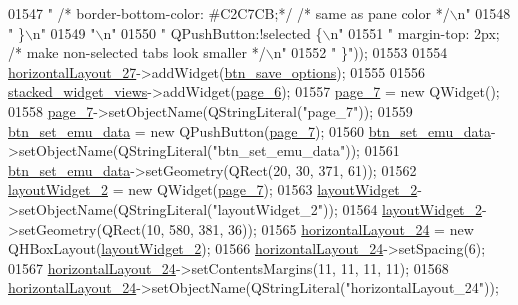 \begin{DoxyCode}
01547 \textcolor{stringliteral}{"   /*  border-bottom-color: #C2C7CB;*/ /* same as pane color */\(\backslash\)n"}
01548 \textcolor{stringliteral}{" \}\(\backslash\)n"}
01549 \textcolor{stringliteral}{"\(\backslash\)n"}
01550 \textcolor{stringliteral}{" QPushButton:!selected \{\(\backslash\)n"}
01551 \textcolor{stringliteral}{"     margin-top: 2px; /* make non-selected tabs look smaller */\(\backslash\)n"}
01552 \textcolor{stringliteral}{" \}"}));
01553 
01554         \hyperlink{a00027_acbfe65f9d2895246b00c82c815b5369e}{horizontalLayout\_27}->addWidget(\hyperlink{a00027_a409e5b794dbab22d7b958be406b6a030}{btn\_save\_options});
01555 
01556         \hyperlink{a00027_a59e39bd3d716004e840a5be5dda18b96}{stacked\_widget\_views}->addWidget(\hyperlink{a00027_a48c3dca01f963265cd2ffca998842e05}{page\_6});
01557         \hyperlink{a00027_a2a58b14a203be787ef1600453f795d71}{page\_7} = \textcolor{keyword}{new} QWidget();
01558         \hyperlink{a00027_a2a58b14a203be787ef1600453f795d71}{page\_7}->setObjectName(QStringLiteral(\textcolor{stringliteral}{"page\_7"}));
01559         \hyperlink{a00027_ad05944ce9c8afb0ab60549a326b8e0af}{btn\_set\_emu\_data} = \textcolor{keyword}{new} QPushButton(\hyperlink{a00027_a2a58b14a203be787ef1600453f795d71}{page\_7});
01560         \hyperlink{a00027_ad05944ce9c8afb0ab60549a326b8e0af}{btn\_set\_emu\_data}->setObjectName(QStringLiteral(\textcolor{stringliteral}{"btn\_set\_emu\_data"}));
01561         \hyperlink{a00027_ad05944ce9c8afb0ab60549a326b8e0af}{btn\_set\_emu\_data}->setGeometry(QRect(20, 30, 371, 61));
01562         \hyperlink{a00027_a873441ec9cec68e0d4eacee271765553}{layoutWidget\_2} = \textcolor{keyword}{new} QWidget(\hyperlink{a00027_a2a58b14a203be787ef1600453f795d71}{page\_7});
01563         \hyperlink{a00027_a873441ec9cec68e0d4eacee271765553}{layoutWidget\_2}->setObjectName(QStringLiteral(\textcolor{stringliteral}{"layoutWidget\_2"}));
01564         \hyperlink{a00027_a873441ec9cec68e0d4eacee271765553}{layoutWidget\_2}->setGeometry(QRect(10, 580, 381, 36));
01565         \hyperlink{a00027_a9403b9a7c13814220caeb1748ef9e672}{horizontalLayout\_24} = \textcolor{keyword}{new} QHBoxLayout(\hyperlink{a00027_a873441ec9cec68e0d4eacee271765553}{layoutWidget\_2});
01566         \hyperlink{a00027_a9403b9a7c13814220caeb1748ef9e672}{horizontalLayout\_24}->setSpacing(6);
01567         \hyperlink{a00027_a9403b9a7c13814220caeb1748ef9e672}{horizontalLayout\_24}->setContentsMargins(11, 11, 11, 11);
01568         \hyperlink{a00027_a9403b9a7c13814220caeb1748ef9e672}{horizontalLayout\_24}->setObjectName(QStringLiteral(\textcolor{stringliteral}{"horizontalLayout\_24"}));

\end{DoxyCode}
